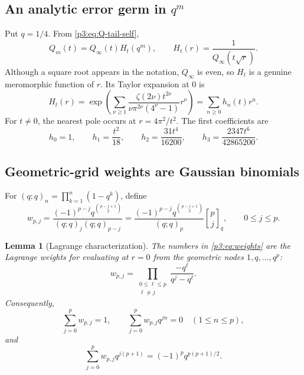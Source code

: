 \documentclass[11pt,oneside]{article}
\numberwithin{equation}{section}
\newtheorem{lemma}[theorem]{Lemma}
\theoremstyle{definition}
\theoremstyle{remark}
\newcommand{\qbinom}[3]{\genfrac{[}{]}{0pt}{}{#1}{#2}_{#3}}
\begin{document}
\subsection{An analytic error germ in $q^m$}

Put $q=1/4$.  From \eqref{p3:eq:Q-tail-self},
\begin{equation}
 Q_m(t)=Q_\infty(t)H_t(q^m),
 \qquad
 H_t(r)=\frac{1}{Q_\infty(t\sqrt r)}.
 \label{p3:eq:Hdef}
\end{equation}
Although a square root appears in the notation, $Q_\infty$ is even, so $H_t$ is a genuine
meromorphic function of $r$.  Its Taylor expansion at $0$ is
\begin{equation}
 H_t(r)=\exp\!\left(\sum_{\nu\ge1}
 \frac{\zeta(2\nu)t^{2\nu}}{\nu\pi^{2\nu}(4^\nu-1)}r^\nu\right)
 =\sum_{n\ge0}h_n(t)r^n.
 \label{p3:eq:Hseries}
\end{equation}
For $t\ne0$, the nearest pole occurs at $r=4\pi^2/t^2$.  The first coefficients are
\begin{equation}
 h_0=1,\qquad h_1=\frac{t^2}{18},\qquad
 h_2=\frac{31t^4}{16200},\qquad
 h_3=\frac{2347t^6}{42865200}.
 \label{p3:eq:hfirst}
\end{equation}

\subsection{Geometric-grid weights are Gaussian binomials}

For $(q;q)_n=\prod_{k=1}^{n}(1-q^k)$, define
\begin{equation}
 w_{p,j}=
 \frac{(-1)^{p-j}q^{\binom{p-j+1}{2}}}
 {(q;q)_j(q;q)_{p-j}}
 =\frac{(-1)^{p-j}q^{\binom{p-j+1}{2}}}{(q;q)_p}
   \qbinom{p}{j}{q},
 \qquad 0\le j\le p.
 \label{p3:eq:weights}
\end{equation}

\begin{lemma}[Lagrange characterization]
\label{p3:lem:weights}
The numbers in \eqref{p3:eq:weights} are the Lagrange weights for evaluating at $r=0$ from the
geometric nodes $1,q,\ldots,q^p$:
\begin{equation}
 w_{p,j}=\prod_{\substack{0\le\ell\le p\\\ell\ne j}}
 \frac{-q^\ell}{q^j-q^\ell}.
 \label{p3:eq:weights-Lagrange}
\end{equation}
Consequently,
\begin{equation}
 \sum_{j=0}^{p}w_{p,j}=1,
 \qquad
 \sum_{j=0}^{p}w_{p,j}q^{jn}=0\quad(1\le n\le p),
 \label{p3:eq:moment-cancel}
\end{equation}
and
\begin{equation}
 \sum_{j=0}^{p}w_{p,j}q^{j(p+1)}
 =(-1)^pq^{p(p+1)/2}.
 \label{p3:eq:first-uncancelled}
\end{equation}
\end{lemma}
\end{document}
